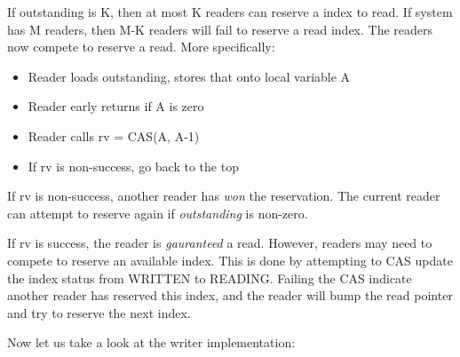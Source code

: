 If outstanding is K, then at most K readers can reserve a index to read. If system 
has M readers, then M-K readers will fail to reserve a read index. The readers now 
compete to reserve a read. More specifically: 
\begin{itemize}
    \item Reader loads outstanding, stores that onto local variable A
    \item Reader early returns if A is zero 
    \item Reader calls rv = CAS(A, A-1)
    \item If rv is non-success, go back to the top
\end{itemize}

If rv is non-success, another reader has \textit{won} the reservation. The
current reader can attempt to reserve again if \textit{outstanding} is
non-zero.\newline

If rv is success, the reader is \textit{gauranteed} a read. However, readers may
need to compete to reserve an available index. This is done by attempting to CAS
update the index status from WRITTEN to READING. Failing the CAS indicate
another reader has reserved this index, and the reader will bump the read
pointer and try to reserve the next index.\newline

Now let us take a look at the writer implementation:\newline

